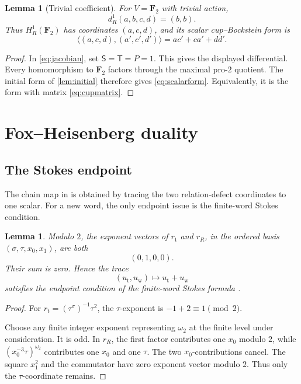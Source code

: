 \documentclass[11pt]{article}
\numberwithin{equation}{section}
\newtheorem{lemma}[theorem]{Lemma}
\theoremstyle{definition}
\theoremstyle{remark}
\newcommand{\F}{\mathbf F}
\newcommand{\rt}{r_{\mathrm t}}
\newcommand{\rR}{r_R}
\newcommand{\omegaTwo}{\omega_2}
\begin{document}
\begin{lemma}[Trivial coefficient]\label{lem:trivial}
For \(V=\F_2\) with trivial action,
\[
  d^1_R(a,b,c,d)=(b,b).
\]
Thus \(H^1_R(\F_2)\) has coordinates \((a,c,d)\), and its scalar
cup--Bockstein form is
\begin{equation}\label{eq:scalarform}
  \langle(a,c,d),(a',c',d')\rangle
  =ac'+ca'+dd'.
\end{equation}
\end{lemma}

\begin{proof}
In \cref{eq:jacobian}, set
\(\mathsf S=\mathsf T=P=1\).  This gives the displayed differential.
Every homomorphism to \(\F_2\) factors through the maximal pro-\(2\)
quotient.  The initial form of \cref{lem:initial} therefore gives
\cref{eq:scalarform}.  Equivalently, it is the form with matrix
\cref{eq:cupmatrix}.
\end{proof}

\section{Fox--Heisenberg duality}

\subsection{The Stokes endpoint}

The chain map in \cite[\S5.2]{RT} is obtained by tracing the two
relation-defect coordinates to one scalar.  For a new word, the only
endpoint issue is the finite-word Stokes condition.

\begin{lemma}\label{lem:stokes}
Modulo \(2\), the exponent vectors of \(\rt\) and \(\rR\), in the ordered
basis \((\sigma,\tau,x_0,x_1)\), are both
\[
  (0,1,0,0).
\]
Their sum is zero.  Hence the trace
\[
  (u_{\mathrm t},u_{\mathrm w})\longmapsto
  u_{\mathrm t}+u_{\mathrm w}
\]
satisfies the endpoint condition of the finite-word Stokes formula
\cite[Lemma~5.7 and Proposition~5.8]{RT}.
\end{lemma}

\begin{proof}
For \(\rt=(\tau^\sigma)^{-1}\tau^2\), the \(\tau\)-exponent is
\(-1+2\equiv1\pmod2\).

Choose any finite integer exponent representing \(\omegaTwo\) at the
finite level under consideration.  It is odd.  In \(\rR\), the first
factor contributes one \(x_0\) modulo \(2\), while
\((x_0^{-3}\tau)^{\omegaTwo}\) contributes one \(x_0\) and one \(\tau\).
The two \(x_0\)-contributions cancel.  The square \(x_1^2\) and the
commutator have zero exponent vector modulo \(2\).  Thus only the
\(\tau\)-coordinate remains.
\end{proof}
\end{document}
